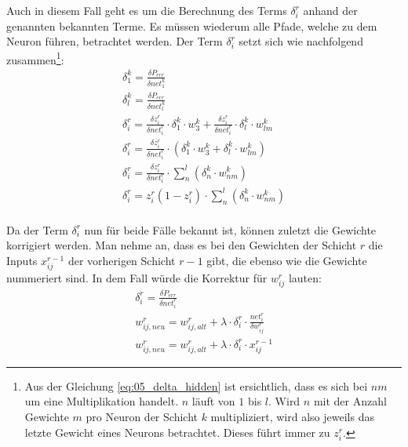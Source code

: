 Auch in diesem Fall geht es um die Berechnung des Terms $\delta_i^r$ anhand der genannten bekannten Terme. Es müssen wiederum
alle Pfade, welche zu dem Neuron führen, betrachtet werden. Der Term $\delta_i^r$ setzt sich wie nachfolgend zusammen\footnote{Aus der Gleichung \ref{eq:05_delta_hidden} ist ersichtlich, dass es sich bei $nm$ um eine Multiplikation handelt. $n$ läuft
von $1$ bis $l$. Wird $n$ mit der Anzahl Gewichte $m$ pro Neuron der Schicht $k$ multipliziert, wird also jeweils das letzte Gewicht eines
Neurons betrachtet. Dieses führt immer zu $z_i^r$.
}:
\begin{align}
    \delta_1^k = \frac{\delta P_{err}}{\delta net_1^k}\\
    \delta_l^k = \frac{\delta P_{err}}{\delta net_l^k}\\
    \delta_i^r = \frac{\delta z_i^r}{\delta net_i^r} \cdot \delta_1^k \cdot w_3^k + \frac{\delta z_i^r}{\delta net_i^r} \cdot \delta_l^k \cdot w_{lm}^k\\
    \delta_i^r = \frac{\delta z_i^r}{\delta net_i^r} \cdot (\delta_1^k \cdot w_3^k + \delta_l^k \cdot w_{lm}^k)\\
    \delta_i^r = \frac{\delta z_i^r}{\delta net_i^r} \cdot \sum_n^l(\delta_n^k \cdot w_{nm}^k)\\
    \delta_i^r = z_i^r(1 - z_i^r) \cdot \sum_n^l(\delta_n^k \cdot w_{nm}^k)\label{eq:05_delta_hidden}
\end{align}
\\

Da der Term $\delta_i^r$ nun für beide Fälle bekannt ist, können zuletzt die Gewichte korrigiert werden.
Man nehme an, dass es bei den Gewichten der Schicht $r$ die Inputs $x_{ij}^{r-1}$ der vorherigen Schicht $r-1$ gibt,
die ebenso wie die Gewichte nummeriert sind. In dem Fall würde die Korrektur für $w_{ij}^r$ lauten:
\begin{align}
    \delta_i^r = \frac{\delta P_{err}}{\delta net_i^r}\\
    w_{ij, neu}^r = w_{ij, alt}^r + \lambda \cdot \delta_i^r \cdot \frac{net_i^r}{\delta w_{ij}^r}\\
    w_{ij, neu}^r = w_{ij, alt}^r + \lambda \cdot \delta_i^r \cdot x_{ij}^{r-1}
\end{align}


